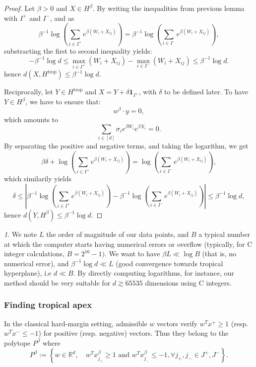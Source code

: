 \documentclass[oneside,english]{amsart}
\numberwithin{equation}{section}
\numberwithin{figure}{section}
\theoremstyle{plain}
\theoremstyle{definition}
\theoremstyle{plain}
\theoremstyle{remark}
\newtheorem{rem}[thm]{\protect\remarkname}
\theoremstyle{plain}
\theoremstyle{definition}
\theoremstyle{definition}
\providecommand{\remarkname}{Remark}
\begin{document}
\begin{proof}
Let $\beta>0$ and $X\in H^{\beta}$. By writing the inequalities
from previous lemma with $I^{+}$ and $I^{-}$, and as $$\beta^{-1}\log\left(\sum_{i\in I^{+}}e^{\beta(W_{i}+X_{ij})}\right)=\beta^{-1}\log\left(\sum_{i\in I^{-}}e^{\beta(W_{i}+X_{ij})}\right),$$
substracting the first to second inequality yields: 
\[
-\beta^{-1}\log d\le\max_{i\in I^{+}}(W_{i}+X_{ij})-\max_{i\in I^{-}}(W_{i}+X_{ij})\le\beta^{-1}\log d.
\]
hence $d(X,H^{\text{trop}})\le\beta^{-1}\log d$.

Reciprocally, let $Y\in H^{\text{trop}}$ and $X=Y+\delta\mathbf{1}_{I^{+}}$,
with $\delta$ to be defined later. To have $Y\in H^{\beta}$, we
have to ensure that: 
\[
w^{\beta}\cdot y=0,
\]
which amounts to 
\[
\sum_{i\in[d]}\sigma_{i}e^{\beta W_{i}}e^{\beta X_{i}}=0.
\]
By separating the positive and negative terms, and taking the logarithm,
we get 
\[
\beta\delta+\log\left(\sum_{i\in I^{+}}e^{\beta(W_{i}+X_{ij})}\right)=\log\left(\sum_{i\in I^{-}}e^{\beta(W_{i}+X_{ij})}\right),
\]
which similarily yields 
\[
\delta\le\left|\beta^{-1}\log\left(\sum_{i\in I^{+}}e^{\beta(W_{i}+X_{ij})}\right)-\beta^{-1}\log\left(\sum_{i\in I^{-}}e^{\beta(W_{i}+X_{ij})}\right)\right|\le\beta^{-1}\log d,
\]
hence $d(Y,H^{\beta})\le\beta^{-1}\log d$. 
\end{proof}
\begin{rem}
We note $L$ the order of magnitude of our data points, and $B$ a
typical number at which the computer starts having numerical errors
or overflow (typically, for C integer calculations, $B=2^{16}-1)$.
We want to have $\beta L\ll\log B$ (that is, no numerical error),
and $\beta^{-1}\log d\ll L$ (good convergence towards tropical hyperplane),
i.e $d\ll B$. By directly computing logarithms, for instance, our
method should be very suitable for $d\apprge65535$ dimensions using
C integers. 
\end{rem}


\subsubsection{Finding tropical apex}

In the classical hard-margin setting, admissible $w$ vectors verify
$w^{T}x^{+}\ge1$ (resp. $w^{T}x^{-}\le-1$) for positive (resp. negative)
vectors. Thus they belong to the polytope $P^{\beta}$ where 
\[
P^{\beta}:=\left\{ w\in\mathbb{R}^{d},\quad w^{T}x_{j_{+}}^{\beta}\ge1\text{ and }w^{T}x_{j_{-}}^{\beta}\le-1,\forall j_{+},j_{-}\in J^{+},J^{-}\right\} .
\]
\end{document}
